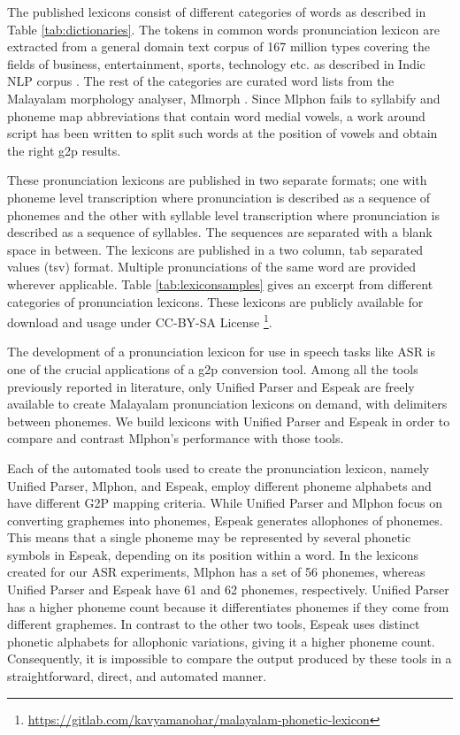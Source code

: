 The published lexicons consist of different categories of words as described in Table \ref{tab:dictionaries}. The tokens in common words pronunciation lexicon are extracted from a general domain text corpus of 167 million types covering the fields of business, entertainment, sports, technology etc. as described in Indic NLP corpus \cite{kunchukuttan2020ai4bharat}. The rest of the categories are curated word lists from the Malayalam morphology analyser, Mlmorph \cite{thottingal2019finite}. Since Mlphon fails to syllabify and phoneme map abbreviations that contain word medial vowels, a work around script has been written to split such words at the position of vowels and obtain the right \gls{g2p} results.


These pronunciation lexicons are published in two separate formats; one with
phoneme level transcription where pronunciation is described as a sequence of
phonemes and the other with syllable level transcription where pronunciation is
described as a sequence of syllables. The sequences are separated with a blank
space in between. The lexicons are published in a two column, tab separated
values (tsv) format. Multiple pronunciations of the same word are provided
wherever applicable. Table \ref{tab:lexiconsamples} gives an excerpt from different categories of
pronunciation lexicons. These lexicons are publicly available for download and
usage under CC-BY-SA License \footnote{\url{https://gitlab.com/kavyamanohar/malayalam-phonetic-lexicon}}.



The development of a pronunciation lexicon for use in speech tasks like ASR is
one of the crucial applications of a \gls{g2p} conversion tool. Among all the tools
previously reported in literature, only Unified Parser and Espeak are freely
available to create Malayalam pronunciation lexicons on demand, with delimiters
between phonemes. We build lexicons with Unified Parser and Espeak in order to
compare and contrast Mlphon's performance with those tools.


Each of the automated tools used to create the pronunciation lexicon, namely Unified Parser, Mlphon, and Espeak, employ different phoneme alphabets and have different G2P mapping criteria. While Unified Parser and Mlphon focus on converting graphemes into phonemes, Espeak generates allophones of phonemes. This means that a single phoneme may be represented by several phonetic symbols in Espeak, depending on its position within a word. In the lexicons created for our ASR experiments, Mlphon has a set of 56 phonemes, whereas Unified Parser and Espeak have 61 and 62 phonemes, respectively. Unified Parser has a higher phoneme count because it differentiates phonemes if they come from different graphemes. In contrast to the other two tools, Espeak uses distinct phonetic alphabets for allophonic variations, giving it a higher phoneme count. Consequently, it is impossible to compare the output produced by these tools in a straightforward, direct, and automated manner.

